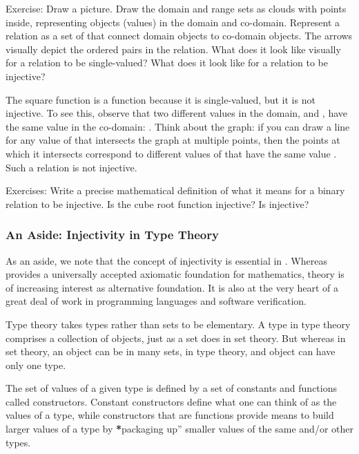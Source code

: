 \documentclass[letterpaper,10pt,english]{sphinxmanual}
\begin{document}
Exercise: Draw a picture. Draw the domain and range sets as clouds
with points inside, representing objects (values) in the domain and
co-domain. Represent a relation as a set of  that connect
domain objects to co-domain objects. The arrows visually depict the
ordered pairs in the relation. What does it look like visually for a
relation to be single-valued? What does it look like for a relation to
be injective?

The square function is a function because it is single-valued, but it
is not injective. To see this, observe that two different values in
the domain,  and , have the same value in the co-domain: .
Think about the graph: if you can draw a  line for any
value of  that intersects the graph at multiple points, then the
points at which it intersects correspond to different values of 
that have the same value . Such a relation is not
injective.

Exercises: Write a precise mathematical definition of what it means
for a binary relation to be injective.  Is the cube root function
injective? Is  injective?


\subsubsection{An Aside: Injectivity in Type Theory}
\label{\detokenize{07-set-theory:an-aside-injectivity-in-type-theory}}
As an aside, we note that the concept of injectivity is essential in
.  Whereas  provides a universally accepted
axiomatic foundation for mathematics,  theory is of increasing
interest as alternative foundation. It is also at the very heart of a
great deal of work in programming languages and software verification.

Type theory takes types rather than sets to be elementary. A type in
type theory comprises a collection of objects, just as a set does in
set theory. But whereas in set theory, an object can be in many sets,
in type theory, and object can have only one type.

The set of values of a given type is defined by a set of constants and
functions called constructors. Constant constructors define what one
can think of as the  values of a type, while constructors
that are functions provide means to build larger values of a type by
{\color{red}\bfseries{}*}packaging up” smaller values of the same and/or other types.
\end{document}
